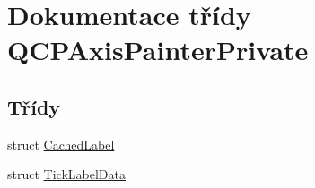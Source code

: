 \hypertarget{classQCPAxisPainterPrivate}{}\section{Dokumentace třídy Q\+C\+P\+Axis\+Painter\+Private}
\label{classQCPAxisPainterPrivate}
\subsection*{Třídy}
\begin{DoxyCompactItemize}
\item 
struct \hyperlink{structQCPAxisPainterPrivate_1_1CachedLabel}{Cached\+Label}
\item 
struct \hyperlink{structQCPAxisPainterPrivate_1_1TickLabelData}{Tick\+Label\+Data}
\end{DoxyCompactItemize}
